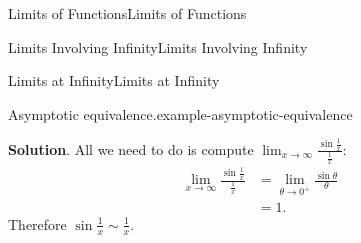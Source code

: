 \documentclass[10pt,]{book}
\numberwithin{equation}{section}
\begin{document}
\begin{chapterptx}{Limits of Functions}{}{Limits of Functions}{}{}
\begin{sectionptx}{Limits Involving Infinity}{}{Limits Involving Infinity}{}{}
\begin{subsectionptx}{Limits at Infinity}{}{Limits at Infinity}{}{}
\begin{example}{Asymptotic equivalence.}{example-asymptotic-equivalence}
\par\smallskip%
\noindent\textbf{Solution}.\hypertarget{solution-15}{}\quad%
\hypertarget{p-73}{}%
All we need to do is compute \(\lim_{x\to\infty}\frac{\sin\frac{1}{x}}{\frac{1}{x}}:\)%
\begin{align*}
\lim_{x\to\infty}\frac{\sin\frac{1}{x}}{\frac{1}{x}} & = \lim_{\theta\to0^{+}}\frac{\sin\theta}{\theta} \\
& = 1. 
\end{align*}
Therefore \(\sin\frac{1}{x}\sim\frac{1}{x}\).%
\end{example}
\end{subsectionptx}
\end{sectionptx}
\end{chapterptx}
%
%
\typeout{************************************************}
\typeout{************************************************}
%
\end{document}

